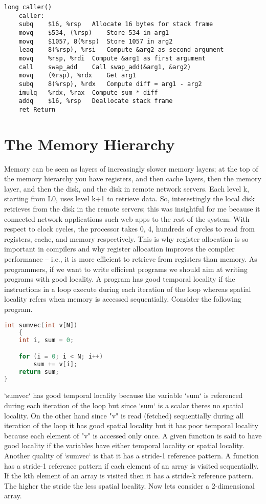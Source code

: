 \documentclass{amsbook}
\begin{document}
\begin{lstlisting}
long caller()
	caller:
	subq	$16, %rsp	Allocate 16 bytes for stack frame
	movq	$534, (%rsp)	Store 534 in arg1
	movq	$1057, 8(%rsp)	Store 1057 in arg2
	leaq	8(%rsp), %rsi	Compute &arg2 as second argument
	movq	%rsp, %rdi	Compute &arg1 as first argument
	call	swap_add	Call swap_add(&arg1, &arg2)
	movq	(%rsp), %rdx	Get arg1
	subq	8(%rsp), %rdx	Compute diff = arg1 - arg2
	imulq	%rdx, %rax	Compute sum * diff
	addq	$16, %rsp	Deallocate stack frame
	ret Return
\end{lstlisting}

\section{The Memory Hierarchy}

Memory can be seen as layers of increasingly slower memory layers; at the top of the memory hierarchy you have registers, and then cache layers, then the memory layer, and then the disk, and the disk in remote network servers. Each level k, starting from L0, uses level k+1 to retrieve data. So, interestingly the local disk retrieves from the disk in the remote servers; this was insightful for me because it connected network applications such web apps to the rest of the system. With respect to clock cycles, the processor takes 0, 4, hundreds of cycles to read from registers, cache, and memory respectively. This is why register allocation is so important in compilers and why register allocation improves the compiler performance -- i.e., it is more efficient to retrieve from registers than memory. As programmers, if we want to write efficient programs we should aim at writing programs with good locality. A program has good temporal locality if the instructions in a loop execute during each iteration of the loop whereas spatial locality refers when memory is accessed sequentially. Consider the following program.

\begin{lstlisting}[language=C]
int sumvec(int v[N])
	{
	int i, sum = 0;

	for (i = 0; i < N; i++)
		sum += v[i];
	return sum;
}
\end{lstlisting}

`sumvec` has good temporal locality because the variable `sum` is referenced during each iteration of the loop but since `sum` is a scalar theres no spatial locality. On the other hand since "v" is read (fetched) sequentially during all iteration of the loop it has good spatial locality but it has poor temporal locality because each element of "v" is accessed only once. A given function is said to have good locality if the variables have either temporal locality or spatial locality. Another quality of `sumvec` is that it has a stride-1 reference pattern. A function has a stride-1 reference pattern if each element of an array is visited sequentially. If the kth element of an array is visited then it has a stride-k reference pattern. The higher the stride the less spatial locality. Now lets consider a 2-dimensional array.
\end{document}
